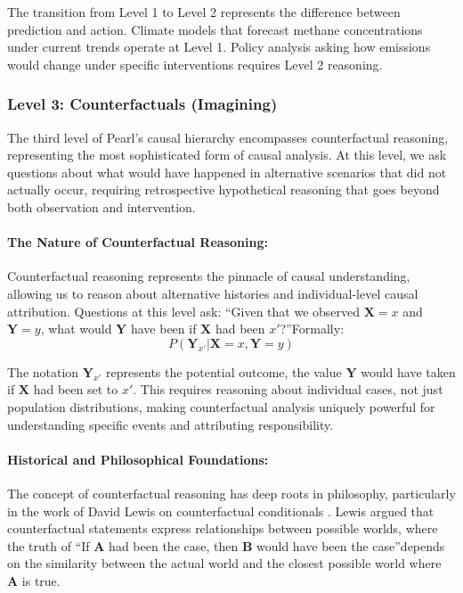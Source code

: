 The transition from Level 1 to Level 2 represents the difference between prediction and action. Climate models that forecast methane concentrations under current trends operate at Level 1. Policy analysis asking how emissions would change under specific interventions requires Level 2 reasoning.

\subsubsection{Level 3: Counterfactuals (Imagining)}

The third level of Pearl's causal hierarchy encompasses counterfactual reasoning, representing the most sophisticated form of causal analysis. At this level, we ask questions about what would have happened in alternative scenarios that did not actually occur, requiring retrospective hypothetical reasoning that goes beyond both observation and intervention.

\paragraph{The Nature of Counterfactual Reasoning:}

Counterfactual reasoning represents the pinnacle of causal understanding, allowing us to reason about alternative histories and individual-level causal attribution. Questions at this level ask: \textquotedblleft Given that we observed $\mathbf{X}=x$ and $\mathbf{Y}=y$, what would $\mathbf{Y}$ have been if $\mathbf{X}$ had been $x'$?\textquotedblright Formally:
\begin{equation}
	P(\mathbf{Y}_{x'}|\mathbf{X}=x, \mathbf{Y}=y)
\end{equation}

The notation $\mathbf{Y}_{x'}$ represents the potential outcome, the value $\mathbf{Y}$ would have taken if $\mathbf{X}$ had been set to $x'$. This requires reasoning about individual cases, not just population distributions, making counterfactual analysis uniquely powerful for understanding specific events and attributing responsibility.

\paragraph{Historical and Philosophical Foundations:}

The concept of counterfactual reasoning has deep roots in philosophy, particularly in the work of David Lewis on counterfactual conditionals \cite{Lewis1973}. Lewis argued that counterfactual statements express relationships between possible worlds, where the truth of \textquotedblleft If $\mathbf{A}$ had been the case, then $\mathbf{B}$ would have been the case\textquotedblright depends on the similarity between the actual world and the closest possible world where $\mathbf{A}$ is true.


